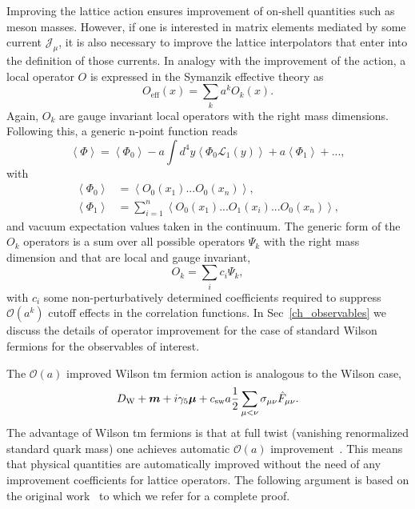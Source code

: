 Improving the lattice action ensures improvement of on-shell quantities such as meson masses. However, if one is interested in matrix elements mediated by some current $\mathcal{J}_{\mu}$, it is also necessary to improve the lattice interpolators that enter into the definition of those currents. In analogy with the improvement of the action, a local operator $O$ is expressed in the Symanzik effective theory as
\begin{equation}
O_{\textrm{eff}}(x)=\sum_ka^kO_k(x).
\end{equation}
Again, $O_k$ are gauge invariant local operators with the right mass dimensions. Following this, a generic n-point function reads
\begin{equation}
\label{ch_foundation:eq:Oimpr}
\left<\Phi\right>=\left<\Phi_0\right>-a\int d^4y\left<\Phi_0\mathcal{L}_1(y)\right>+a\left<\Phi_1\right>+...,
\end{equation}
with 
\begin{align}
\left<\Phi_0\right>&=\left<O_0(x_1)...O_0(x_n)\right>, \\
\left<\Phi_1\right>&=\sum_{i=1}^n\left<O_0(x_1)...O_1(x_i)...O_0(x_n)\right>,
\end{align}
and vacuum expectation values taken in the continuum. The generic form of the $O_k$ operators is a sum over all possible operators $\Psi_k$ with the right mass dimension and that are local and gauge invariant,
\begin{equation}
O_k=\sum_ic_i\Psi_k,
\end{equation}
with $c_i$ some non-perturbatively determined coefficients required to suppress $\mathcal{O}(a^k)$ cutoff effects in the correlation functions. In Sec~\ref{ch_observables} we discuss the details of operator improvement for the case of standard Wilson fermions for the observables of interest.

The $\mathcal{O}(a)$ improved Wilson tm fermion action is analogous to the Wilson case,
\begin{equation}
D_{\textrm W}+\boldsymbol{m}+i\gamma_5\boldsymbol{\mu}+c_{\textrm{sw}}a\frac{1}{2}\sum_{\mu<\nu}\sigma_{\mu\nu}\hat{F}_{\mu\nu}.
\end{equation}
The advantage of Wilson tm fermions is that at full twist (vanishing renormalized standard quark mass) one achieves automatic $\mathcal{O}(a)$ improvement~\cite{}. This means that physical quantities are automatically improved without the need of any improvement coefficients for lattice operators. The following argument is based on the original work~\cite{} to which we refer for a complete proof.

